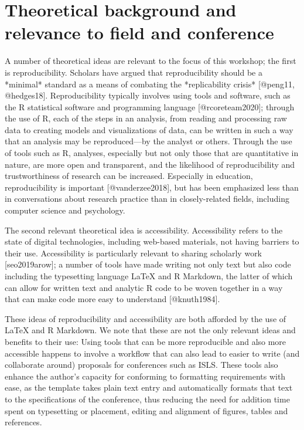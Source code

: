\documentclass{article}
\begin{document}
\section{Theoretical background and relevance to field and conference}

A number of theoretical ideas are relevant to the focus of this workshop;
the first is reproducibility. Scholars have argued that reproducibility should
be a *minimal* standard as a means of combating the *replicability crisis* [@peng11, @hedges18]. 
Reproducibility typically involves using tools and software, such as the R 
statistical software and programming language [@rcoreteam2020]; through the use of 
R, each of the steps in an analysis, from reading and processing raw data to creating
models and visualizations of data, can be written in such a way that an analysis
may be reproduced---by the analyst or others. Through the use of tools such as R, 
analyses, especially but not only those that are quantitative in nature, are more
open and transparent, and the likelihood of reproducibility and trustworthiness
of research can be increased. Especially in education, reproducibility is 
important [@vanderzee2018], but has been emphasized less than in conversations about 
research practice than in closely-related fields, including computer science and psychology.

The second relevant theoretical idea is accessibility. Accessibility refers to 
the state of digital technologies, including web-based materials, not having barriers
to their use. Accessibility is particularly relevant to sharing scholarly work [seo2019arow];
a number of tools have made writing not only text but also code including the typesetting 
language LaTeX and R Markdown,  the latter of which can allow for written text and analytic 
R code to be woven together in a way that can make code more easy to understand [@knuth1984].

These ideas of reproducibility and accessibility are both afforded by the use of LaTeX and
R Markdown. We note that these are not the only relevant ideas and benefits to their use:
Using tools that can be more reproducible and also more accessible happens to involve a workflow
that can also lead to easier to write (and collaborate around) proposals for conferences such as ISLS. These tools also enhance the author's capacity for conforming to formatting requirements with ease, as the template takes plain text entry and automatically formats that text to the specifications of the conference, thus reducing the need for addition time spent on typesetting or placement, editing and alignment of figures, tables and references. 
\end{document}
